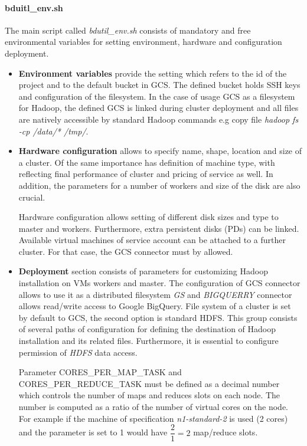 \documentclass[a4paper,12pt,oneside]{report}
\begin{document}
	
	
	\paragraph{bduitl\_env.sh}\label{bdutilenv}The main script called
	\textit{bdutil\_env.sh} consists of mandatory and free environmental variables for setting environment, hardware and configuration deployment.
	
	\begin{itemize}
		\item \textbf{Environment variables} provide the setting which refers to the id
		of the project and to 	the default bucket in GCS. The defined bucket holds SSH keys and configuration of the filesystem. In the case of usage GCS as a filesystem for Hadoop, the defined GCS is linked during cluster deployment and all files are natively accessible by standard Hadoop commands e.g copy file \textit{hadoop fs -cp  /data/* /tmp/}.
		
		\item \textbf{Hardware configuration}
		allows to specify name, shape, location and size of a cluster. Of the same importance has
		definition of machine type, with reflecting final performance of cluster and 
		pricing of service as well. In addition, the parameters 
		for a number of workers and size of the disk are also crucial.
		
		Hardware configuration allows setting of different disk sizes and type to
		master and workers. Furthermore, extra persistent disks (PDs) can be linked.
		Available virtual machines of service account can be attached to a further 
		cluster. For that case, the GCS connector must by allowed.
		
		\item \textbf{Deployment} section consists of parameters for customizing Hadoop
		installation on VMs workers and master. The configuration of GCS connector 
		allows to use it as a distributed filesystem \textit{GS} and \textit{BIGQUERRY}
		connector allows read/write access to Google BigQuery. File
		system of a cluster is set by default to GCS, the second 
		option is standard HDFS. This group consists of several paths of configuration for
		defining the destination of Hadoop installation and its related files. 
		Furthermore, it is essential to configure permission  of \textit{HDFS} data access.
		
		Parameter CORES\_PER\_MAP\_TASK and CORES\_PER\_REDUCE\_TASK must be defined as
		a decimal number which controls the number of maps and reduces slots on each node. 
		The number is computed as a ratio of the number of virtual cores on the node. 
		For example if the machine of specification \textit{ n1-standard-2} 
		is used (2 cores) and the parameter is set to 1 would have $\dfrac{2}{1} = 2$
		map/reduce slots.
	\end{itemize}
	
\end{document}
